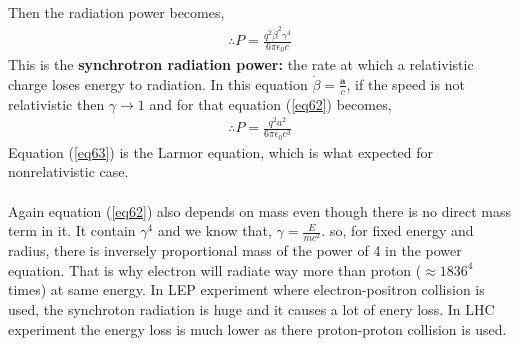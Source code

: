 \documentclass[11pt,a4paper]{article}
\begin{document}
Then the radiation power becomes, 
\begin{align}
    \therefore \boxed{P = \frac{q^2\dot{\beta}^2\gamma^4}{6\pi \epsilon_0c}} \label{eq62}
\end{align}
This is the \textbf{synchrotron radiation power:} the rate at which a relativistic charge loses energy to radiation. 
In this equation $\dot{\beta} = \frac{\mathbf{a}}{c}$, if the speed is not relativistic then $\gamma \rightarrow 1$ 
and for that equation (\ref{eq62}) becomes,
\begin{align}
    \therefore P = \frac{q^2a^2}{6\pi \epsilon_0c^3} \label{eq63} 
\end{align}
Equation (\ref{eq63}) is the Larmor equation, which is what expected for nonrelativistic case.  \\ \\
Again equation (\ref{eq62}) also depends on mass even though there is no direct mass term in it. 
It contain $\gamma^4$ and we know that, $\gamma = \frac{E}{mc^2}$. 
so, for fixed energy and radius, there is inversely proportional mass of the power of 4 in the power equation. 
That is why electron will radiate way more than proton ($\approx 1836^4$ times) at same energy.
In LEP experiment where electron-positron collision is used, the synchroton radiation is huge and it causes a lot of enery loss.
In LHC experiment the energy loss is much lower as there proton-proton collision is used.  
\nocite{*}
\printbibliography
\end{document}
